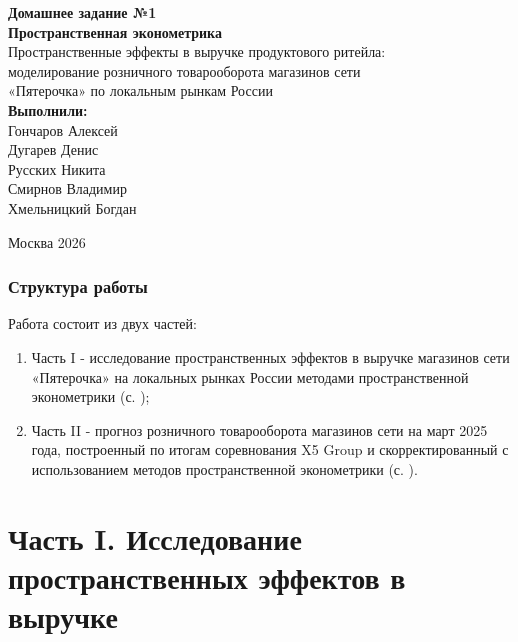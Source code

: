\documentclass[12pt, a4paper]{article}
\begin{document}
\begin{titlepage}
    \thispagestyle{empty}
    \begin{center}
        \linespread{1.1}\selectfont
        \textbf{Домашнее задание №1}\\[1cm]
        \Large{\textbf{Пространственная эконометрика}}\\[1cm]
        \large{Пространственные эффекты в выручке продуктового ритейла:\\
        моделирование розничного товарооборота магазинов сети\\
        «Пятерочка» по локальным рынкам России}\\[1.5cm]
        \normalsize
        \textbf{Выполнили:}\\[0.4cm]
        Гончаров Алексей\\
        Дугарев Денис\\
        Русских Никита\\
        Смирнов Владимир\\
        Хмельницкий Богдан\\[2cm]
    \end{center}
    \vfill
    \begin{center}
        Москва 2026
    \end{center}
\end{titlepage}

\setcounter{page}{2}

\section*{Структура работы}

Работа состоит из двух частей:

\begin{enumerate}
    \item Часть I - исследование пространственных эффектов в выручке магазинов сети «Пятерочка» на
    локальных рынках России методами пространственной эконометрики (с. \pageref{sec:research});
    \item Часть II - прогноз розничного товарооборота магазинов сети на март 2025 года, построенный
    по итогам соревнования X5 Group и скорректированный с использованием методов пространственной
    эконометрики (с. \pageref{sec:forecast}).
\end{enumerate}

\clearpage

\part*{Часть I. Исследование пространственных эффектов в выручке}
\label{sec:research}
\end{document}
